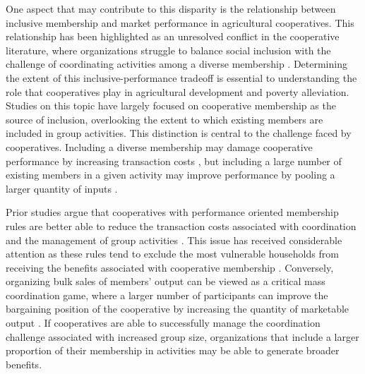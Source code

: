 \documentclass[11pt]{article}
\begin{document}
One aspect that may contribute to this disparity is the relationship between inclusive membership and market performance in agricultural cooperatives. This relationship has been highlighted as an unresolved conflict in the cooperative literature, where organizations struggle to balance social inclusion with the challenge of coordinating activities among a diverse membership \citep{bernard_reaching_2009,world_bank_world_2008}. Determining the extent of this inclusive-performance tradeoff is essential to understanding the role that cooperatives play in agricultural development and poverty alleviation. Studies on this topic have largely focused on cooperative membership as the source of inclusion, overlooking the extent to which existing members are included in group activities. This distinction is central to the challenge faced by cooperatives. %
Including a diverse membership may damage cooperative performance by increasing transaction costs \citep{world_bank_world_2008}, but including a large number of existing members in a given activity may improve performance by pooling a larger quantity of inputs \citep{aflagah_cheap_2019}. 

Prior studies argue that cooperatives with performance oriented membership rules are better able to reduce the transaction costs associated with coordination and the management of group activities \citep{bernard_reaching_2009}. This issue has received considerable attention as these rules tend to exclude the most vulnerable households from receiving the benefits associated with cooperative membership \citep{world_bank_world_2008}. %
Conversely, organizing bulk sales of members' output can be viewed as a critical mass coordination game, where a larger number of participants can improve the bargaining position of the cooperative by increasing the quantity of marketable output \citep{aflagah_cheap_2019}. If cooperatives are able to successfully manage the coordination challenge associated with increased group size, organizations that include a larger proportion of their membership in activities may be able to generate broader benefits. %
\end{document}
